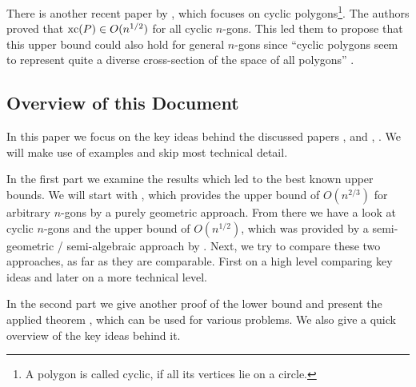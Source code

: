 There is another recent paper by \textcite{kwan2020extension}, which focuses on cyclic polygons\footnote{A polygon is called cyclic, if all its vertices lie on a circle.}. The authors proved that $\operatorname{xc}(P) \in O(n^{1/2})$ for all cyclic $n$-gons.
This led them to propose that this upper bound could also hold for general $n$-gons since ``cyclic polygons seem to represent quite a diverse cross-section of the space of all polygons'' \cite[p.\,3]{kwan2020extension}.



\subsection{Overview of this Document}

In this paper we focus on the key ideas behind the discussed papers , \textcite{shitov2020sublinear} and , \textcite{kwan2020extension}. We will make use of examples and skip most technical detail.

In the first part we examine the results which led to the best known upper bounds.
We will start with \textcite{shitov2020sublinear}, which provides the upper bound of $O(n^{2/3})$ for arbitrary $n$-gons by a purely geometric approach.
From there we have a look at cyclic $n$-gons and the upper bound of $O(n^{1/2})$, which was provided by a semi-geometric / semi-algebraic approach by \textcite{kwan2020extension}.
Next, we try to compare these two approaches, as far as they are comparable. First on a high level comparing key ideas and later on a more technical level.

In the second part we give another proof of the lower bound and present the applied theorem \cite[Theorem~1]{averkov2016maximum}, which can be used for various problems. We also give a quick overview of the key ideas behind it.
